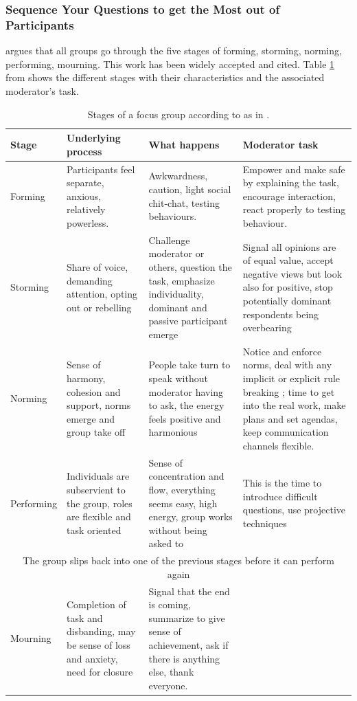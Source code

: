 \documentclass[10pt]{report}
\begin{document}
\subsubsection{Sequence Your Questions to get the Most out of Participants}
\autocite{tuckman1965} argues that all groups go through the five stages of forming, storming, norming, performing, mourning. This work has been widely accepted and cited. Table \ref{table:groupStagesTable} from \autocite{belk2007handbook} shows the different stages with their characteristics and the associated moderator's task.

\begin{table}[!htbp]
\begin{center}
\begin{tabularx}{\textwidth}{lXXX}
\hline
Stage      & Underlying process & What happens & Moderator task \\
\hline \hline
Forming    & Participants feel separate, anxious, relatively powerless. & Awkwardness, caution, light social chit-chat, testing behaviours. & Empower and make safe by explaining the task, encourage interaction, react properly to testing behaviour. \\
\hline
Storming   & Share of voice, demanding attention, opting out or rebelling & Challenge moderator or others, question the task, emphasize individuality, dominant and passive participant emerge & Signal all opinions are of equal value, accept negative views but look also for positive, stop potentially dominant respondents being overbearing\\
\hline
Norming    &  Sense of harmony, cohesion and support, norms emerge and group take off & People take turn to speak without moderator having to ask, the energy feels positive and harmonious & Notice and enforce norms, deal with any implicit or explicit rule breaking ; time to get into the real work, make plans and set agendas, keep communication channels flexible.  \\
\hline
Performing & Individuals are subservient to the group, roles are flexible and task oriented & Sense of concentration and flow, everything seems easy, high energy, group works without being asked to & This is the time to introduce difficult questions, use projective techniques \\
\hline
\multicolumn{4}{c}{The group slips back into one of the previous stages before it can perform again} \\
\hline
Mourning   & Completion of task and disbanding, may be sense of loss and anxiety, need for closure & Signal that the end is coming, summarize to give sense of achievement, ask if there is anything else, thank everyone. &  \\
\hline
\end{tabularx}
\end{center}
\caption{Stages of a focus group according to \autocite{tuckman1965} as in \autocite{belk2007handbook}.}
\label{table:groupStagesTable}

\end{table}
\end{document}
